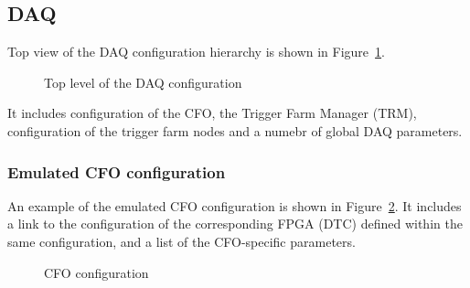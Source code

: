 \subsection{DAQ}
Top view of the DAQ configuration hierarchy is shown in Figure~\ref{figure:daq_config}.

\begin{figure}[H]
  \caption{
    \label{figure:daq_config}
    Top level of the DAQ configuration
  }
\end{figure}

It includes configuration of the CFO, the Trigger Farm Manager (TRM), configuration
of the trigger farm nodes and a numebr of global DAQ parameters.


\newpage
\subsubsection{Emulated CFO configuration}
An example of the emulated CFO configuration is shown in Figure~\ref{figure:cfo_config}.
It includes a link to the configuration of the corresponding FPGA (DTC) 
defined within the same configuration, and a list of the CFO-specific parameters.

\begin{figure}[H]
  \caption{
    \label{figure:cfo_config}
    CFO configuration
  }
\end{figure}

